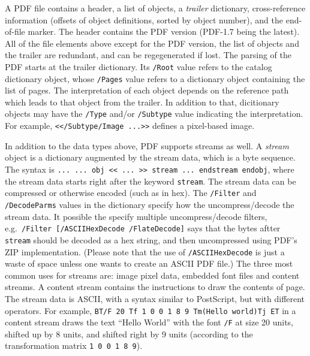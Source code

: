 \documentclass{article}
\begin{document}
A PDF file contains a header, a list of objects, a \emph{trailer}
dictionary, cross-reference information (offsets of object definitions,
sorted by object number), and the end-of-file marker. The header contains
the PDF version (PDF-1.7 being the latest). All of the file elements above
except for the PDF version, the list of objects and the trailer are
redundant, and can be regegenerated if lost. The parsing of the PDF starts
at the trailer dictionary. Its \texttt{/Root} value refers to the catalog
dictionary object, whose \texttt{/Pages} value refers to a dictionary object
containing the list of pages. The interpretation of each object depends on
the reference path which leads to that object from the trailer. In addition
to that, dicitionary objects may have the \texttt{/Type} and/or
\texttt{/Subtype} value indicating the interpretation. For example,
\texttt{\hbox{<}</Subtype/Image ...\hbox{>}>} defines a pixel-based image.

In addition to the data types above, PDF supports streams as well. A
\emph{stream} object is a dictionary augmented by the stream data, which is
a byte sequence. The syntax is \texttt{... ... obj << ... >> stream ...
endstream endobj}, where the stream data starts right after the keyword
\texttt{stream}. The stream data can be compressed or otherwise encoded
(such as in hex). The \texttt{/Filter} and \texttt{/DecodeParms} values in
the dictionary specify how the uncompress/\allowbreak decode the stream data.
It possible the specify multiple uncompress/\allowbreak decode filters,
e.g.\ \texttt{/Filter [/ASCIIHexDecode /FlateDecode]} says that the bytes
aftter \texttt{stream} should be decoded as a hex string, and then
uncompressed using PDF's ZIP implementation. (Please note that the use of
\texttt{/ASCIIHexDecode} is just a waste of space unless one wants to create
an ASCII PDF file.) The three most common uses for
streams are: image pixel data, embedded font files and content streams.
A content stream contains the instructions to draw the contents of page. The
stream data is ASCII, with a syntax similar to PostScript, but with
different operators. For example, \texttt{BT/F 20 Tf 1 0 0 1 8 9
Tm(Hello world)Tj ET} in a content stream draws the text ``Hello World''
with the font \texttt{/F} at size 20 units, shifted up by 8 units, and
shifted right by 9 units (according to the transformation matrix
\texttt{1 0 0 1 8 9}).
\end{document}
